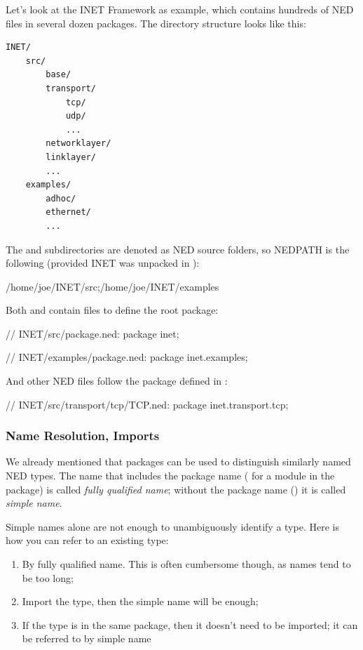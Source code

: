 Let's look at the INET Framework as example, which contains hundreds of NED
files in several dozen packages. The directory structure looks like this:

\begin{Verbatim}
INET/
    src/
        base/
        transport/
            tcp/
            udp/
            ...
        networklayer/
        linklayer/
        ...
    examples/
        adhoc/
        ethernet/
        ...
\end{Verbatim}

The  and  subdirectories are denoted as NED source
folders, so NEDPATH is the following (provided INET was unpacked in
):

\begin{filelisting}
/home/joe/INET/src;/home/joe/INET/examples
\end{filelisting}

Both  and  contain  files to
define the root package:

\begin{ned}
// INET/src/package.ned:
package inet;
\end{ned}

\begin{ned}
// INET/examples/package.ned:
package inet.examples;
\end{ned}

And other NED files follow the package defined in :

\begin{ned}
// INET/src/transport/tcp/TCP.ned:
package inet.transport.tcp;
\end{ned}


\subsubsection{Name Resolution, Imports}

We already mentioned that packages can be used to distinguish
similarly named NED types. The name that includes the package name
( for a  module in the 
package) is called \textit{fully qualified name}; without the package
name () it is called \textit{simple name}.

Simple names alone are not enough to unambiguously identify a type.
Here is how you can refer to an existing type:

\begin{enumerate}
  \item By fully qualified name. This is often cumbersome though,
        as names tend to be too long;
  \item Import the type, then the simple name will be enough;
  \item If the type is in the same package, then it doesn't need to be
        imported; it can be referred to by simple name
\end{enumerate}

